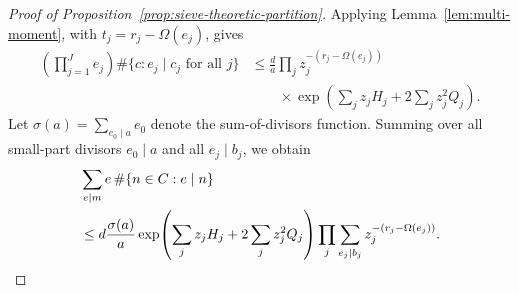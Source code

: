 \documentclass[11pt]{amsart}
\theoremstyle{remark}
\begin{document}
\begin{proof}[Proof of Proposition~\ref{prop:sieve-theoretic-partition}]
Applying Lemma~\ref{lem:multi-moment}, with
$t_j=r_j-\Omega(e_j)$, gives
\begin{align*}
 \left(\prod_{j=1}^{J}e_j\right)
 \#\{c:e_j\mid c_j\text{ for all }j\}
 &\le \frac da\prod_jz_j^{-(r_j-\Omega(e_j))}\\
 &\qquad{}\times
 \exp\!\left(\sum_jz_jH_j+2\sum_jz_j^2Q_j\right).
\end{align*}
Let $\sigma(a)=\sum_{e_0\mid a} e_0$ denote the sum-of-divisors function. Summing over all
small-part divisors $e_0\mid a$ and all $e_j\mid b_j$, we obtain
\begin{align}
&\sum_{e\mid m}e\,\#\{n\in C:e\mid n\}\notag\\
&\le d\frac{\sigma(a)}a
 \exp\!\left(\sum_jz_jH_j+2\sum_jz_j^2Q_j\right)
 \prod_j
 \sum_{e_j\mid b_j}z_j^{-(r_j-\Omega(e_j))}.
\label{eq:class-master-raw}
\end{align}


\end{proof}
\end{document}
